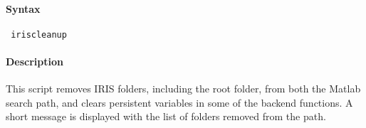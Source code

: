 


	\paragraph{Syntax}
 
 \begin{verbatim}
 iriscleanup
 \end{verbatim}
 
 \paragraph{Description}
 
 This script removes IRIS folders, including the root folder, from both
 the Matlab search path, and clears persistent variables in some of the
 backend functions. A short message is displayed with the list of folders
 removed from the path.


